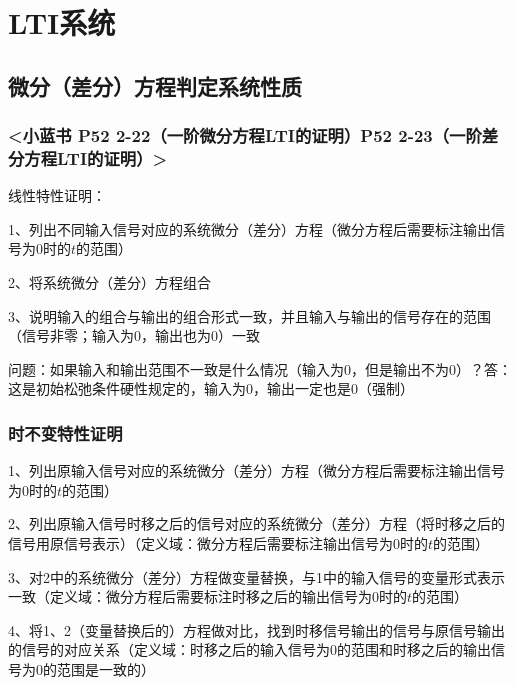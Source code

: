 \chapter{LTI系统}

\section{微分（差分）方程判定系统性质}



\subsection{<小蓝书 P52 2-22（一阶微分方程LTI的证明）P52 2-23（一阶差分方程LTI的证明）>}

线性特性证明：

1、列出不同输入信号对应的系统微分（差分）方程（微分方程后需要标注输出信号为0时的$t$的范围）

2、将系统微分（差分）方程组合

3、说明输入的组合与输出的组合形式一致，并且输入与输出的信号存在的范围（信号非零；输入为0，输出也为0）一致

问题：如果输入和输出范围不一致是什么情况（输入为0，但是输出不为0）？答：这是初始松弛条件硬性规定的，输入为0，输出一定也是0（强制）



\subsection{时不变特性证明}

1、列出原输入信号对应的系统微分（差分）方程（微分方程后需要标注输出信号为0时的$t$的范围）

2、列出原输入信号时移之后的信号对应的系统微分（差分）方程（将时移之后的信号用原信号表示）（定义域：微分方程后需要标注输出信号为0时的$t$的范围）

3、对2中的系统微分（差分）方程做变量替换，与1中的输入信号的变量形式表示一致（定义域：微分方程后需要标注时移之后的输出信号为0时的$t$的范围）

4、将1、2（变量替换后的）方程做对比，找到时移信号输出的信号与原信号输出的信号的对应关系（定义域：时移之后的输入信号为0的范围和时移之后的输出信号为0的范围是一致的）



